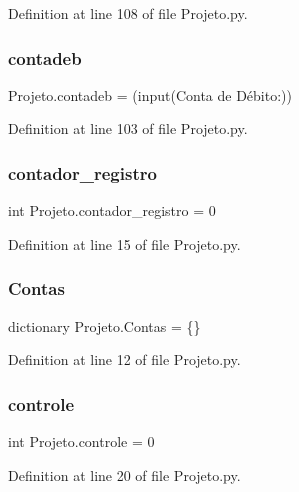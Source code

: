 Definition at line 108 of file Projeto.\+py.

\mbox{\label{namespace_projeto_a5bdbf8d4bbd40bee8b28f58109d6d54a}} 
\subsubsection{contadeb}
{\footnotesize\ttfamily Projeto.\+contadeb = (input(\textquotesingle{}Conta de Débito\+:\textquotesingle{}))}



Definition at line 103 of file Projeto.\+py.

\mbox{\label{namespace_projeto_a2d47cca55b205b097b4df290d4a0acd5}} 
\subsubsection{contador\_registro}
{\footnotesize\ttfamily int Projeto.\+contador\+\_\+registro = 0}



Definition at line 15 of file Projeto.\+py.

\mbox{\label{namespace_projeto_ada709372eddfd739882ef298cbb48282}} 
\subsubsection{Contas}
{\footnotesize\ttfamily dictionary Projeto.\+Contas = \{\}}



Definition at line 12 of file Projeto.\+py.

\mbox{\label{namespace_projeto_a3ae8c4ce87d368e58b45b2935231231b}} 
\subsubsection{controle}
{\footnotesize\ttfamily int Projeto.\+controle = 0}



Definition at line 20 of file Projeto.\+py.

\mbox{\label{namespace_projeto_a9abc4f259e474897d80fc4911b8a5fb3}} 
